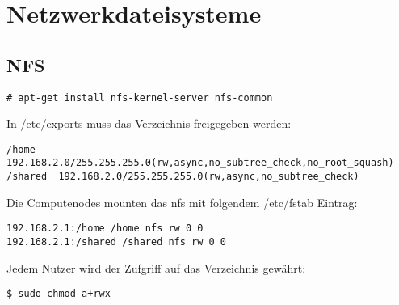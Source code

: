 \chapter{Netzwerkdateisysteme}
\section{NFS}
\begin{lstlisting}[style=Bash]
# apt-get install nfs-kernel-server nfs-common
\end{lstlisting}
In /etc/exports muss das Verzeichnis freigegeben werden:
\begin{lstlisting}[style=Bash,basicstyle=\small]
/home    192.168.2.0/255.255.255.0(rw,async,no_subtree_check,no_root_squash)
/shared  192.168.2.0/255.255.255.0(rw,async,no_subtree_check)
\end{lstlisting}
Die Computenodes mounten das nfs mit folgendem /etc/fstab Eintrag:
\begin{lstlisting}[style=Bash]
192.168.2.1:/home /home nfs rw 0 0
192.168.2.1:/shared /shared nfs rw 0 0
\end{lstlisting}
Jedem Nutzer wird der Zufgriff auf das Verzeichnis gewährt:
\begin{lstlisting}[style=Bash]
$ sudo chmod a+rwx
\end{lstlisting}
